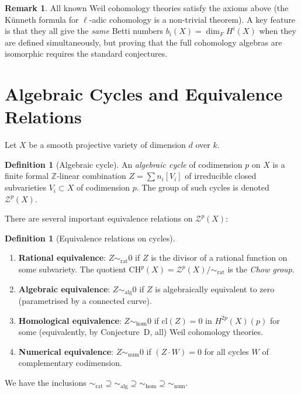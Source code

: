 \documentclass[12pt,a4paper]{amsart}
\theoremstyle{definition}
\newtheorem{definition}[theorem]{Definition}
\newtheorem{remark}[theorem]{Remark}
\newcommand{\Z}{\mathbb{Z}}
\newcommand{\CH}{\mathrm{CH}}
\newcommand{\cl}{\mathrm{cl}}
\begin{document}
\begin{remark}
All known Weil cohomology theories satisfy the axioms above (the K\"unneth
formula for $\ell$-adic cohomology is a non-trivial theorem).  A key feature
is that they all give the \emph{same} Betti numbers $b_i(X) = \dim_F H^i(X)$
when they are defined simultaneously, but proving that the full cohomology
algebras are isomorphic requires the standard conjectures.
\end{remark}

\section{Algebraic Cycles and Equivalence Relations}\label{sec:cycles}

Let $X$ be a smooth projective variety of dimension $d$ over $k$.

\begin{definition}[Algebraic cycle]
An \emph{algebraic cycle} of codimension $p$ on $X$ is a finite formal
$\Z$-linear combination $Z = \sum n_i [V_i]$ of irreducible closed
subvarieties $V_i \subset X$ of codimension $p$.  The group of such cycles
is denoted $\mathcal{Z}^p(X)$.
\end{definition}

There are several important equivalence relations on $\mathcal{Z}^p(X)$:

\begin{definition}[Equivalence relations on cycles]
\begin{enumerate}[label=(\roman*)]
  \item \textbf{Rational equivalence}: $Z \sim_{\mathrm{rat}} 0$ if $Z$ is
        the divisor of a rational function on some subvariety.  The quotient
        $\CH^p(X) = \mathcal{Z}^p(X)/{\sim_{\mathrm{rat}}}$ is the
        \emph{Chow group}.
  \item \textbf{Algebraic equivalence}: $Z \sim_{\mathrm{alg}} 0$ if $Z$ is
        algebraically equivalent to zero (parametrised by a connected curve).
  \item \textbf{Homological equivalence}: $Z \sim_{\mathrm{hom}} 0$ if
        $\cl(Z) = 0$ in $H^{2p}(X)(p)$ for some (equivalently, by Conjecture~D,
        all) Weil cohomology theories.
  \item \textbf{Numerical equivalence}: $Z \sim_{\mathrm{num}} 0$ if
        $(Z \cdot W) = 0$ for all cycles $W$ of complementary codimension.
\end{enumerate}
We have the inclusions
${\sim_{\mathrm{rat}}} \supseteq {\sim_{\mathrm{alg}}} \supseteq
 {\sim_{\mathrm{hom}}} \supseteq {\sim_{\mathrm{num}}}$.
\end{definition}
\end{document}
